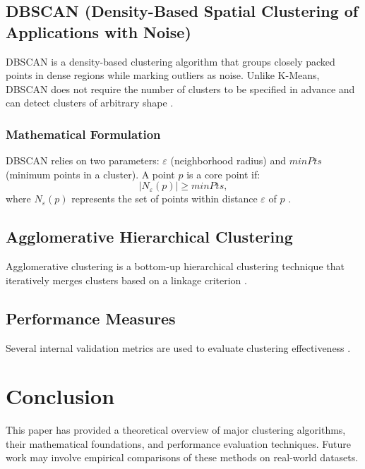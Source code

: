 \documentclass{article}
\begin{document}
\subsection{DBSCAN (Density-Based Spatial Clustering of Applications with Noise)}
DBSCAN is a density-based clustering algorithm that groups closely packed points in dense regions while marking outliers as noise. Unlike K-Means, DBSCAN does not require the number of clusters to be specified in advance and can detect clusters of arbitrary shape \cite{Ester1996}.

\subsubsection{Mathematical Formulation}
DBSCAN relies on two parameters: $\varepsilon$ (neighborhood radius) and $minPts$ (minimum points in a cluster). A point $p$ is a core point if:
\begin{equation}
|N_{\varepsilon}(p)| \geq minPts,
\end{equation}
where $N_{\varepsilon}(p)$ represents the set of points within distance $\varepsilon$ of $p$ \cite{Jain1988}.

\subsection{Agglomerative Hierarchical Clustering}
Agglomerative clustering is a bottom-up hierarchical clustering technique that iteratively merges clusters based on a linkage criterion \cite{Xu2005}.

\subsection{Performance Measures}
Several internal validation metrics are used to evaluate clustering effectiveness \cite{Jain1988}.

\section{Conclusion}
This paper has provided a theoretical overview of major clustering algorithms, their mathematical foundations, and performance evaluation techniques. Future work may involve empirical comparisons of these methods on real-world datasets.
\end{document}
